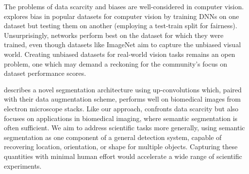 \documentclass[10pt, journal]{IEEEtran}
\begin{document}
The problems of data scarcity and biases are well-considered in computer
vision. \cite{torralba_unbiased_2011} explores bias in popular datasets for
computer vision by training DNNs on one dataset but testing them on another
(employing a test-train split for fairness). Unsurprisingly, networks perform
best on the dataset for which they were trained, even though datasets like
ImageNet aim to capture the unbiased visual world. Creating unbiased datasets
for real-world vision tasks remains an open problem, one which may demand a
reckoning for the community's focus on dataset performance scores.

\cite{ronneberger_u-net:_2015} describes a novel segmentation architecture using
up-convolutions which, paired with their data augmentation scheme, performs well
on biomedical images from electron microscope stacks. Like our approach,
\cite{ronneberger_u-net:_2015} confronts data scarcity but also focuses on
applications in biomedical imaging, where semantic segmentation is often
sufficient. We aim to address scientific tasks more generally, using semantic
segmentation as one component of a general detection system, capable of
recovering location, orientation, or shape for multiple objects. Capturing these
quantities with minimal human effort would accelerate a wide range of scientific
experiments.
\end{document}
